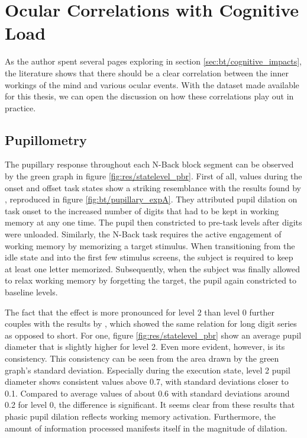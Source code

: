 \section{Ocular Correlations with Cognitive Load}

As the author spent several pages exploring in section \ref{sec:bt/cognitive_impacts}, the literature shows that there should be a clear correlation between the inner workings of the mind and various ocular events. With the dataset made available for this thesis, we can open the discussion on how these correlations play out in practice. 

\subsection{Pupillometry}

The pupillary response throughout each N-Back block segment can be observed by the green graph in figure \ref{fig:res/statelevel_pbr}. First of all, values during the onset and offset task states show a striking resemblance with the results found by \textcite{kahneman1966}, reproduced in figure \ref{fig:bt/pupillary_expA}. They attributed pupil dilation on task onset to the increased number of digits that had to be kept in working memory at any one time. The pupil then constricted to pre-task levels after digits were unloaded. Similarly, the N-Back task requires the active engagement of working memory by memorizing a target stimulus. When transitioning from the idle state and into the first few stimulus screens, the subject is required to keep at least one letter memorized. Subsequently, when the subject was finally allowed to relax working memory by forgetting the target, the pupil again constricted to baseline levels.


The fact that the effect is more pronounced for level 2 than level 0 further couples with the results by \textcite{kahneman1966}, which showed the same relation for long digit series as opposed to short. For one, figure \ref{fig:res/statelevel_pbr} show an average pupil diameter that is slightly higher for level 2. Even more evident, however, is its consistency. This consistency can be seen from the area drawn by the green graph's standard deviation. Especially during the execution state, level 2 pupil diameter shows consistent values above 0.7, with standard deviations closer to 0.1. Compared to average values of about 0.6 with standard deviations around 0.2 for level 0, the difference is significant. It seems clear from these results that phasic pupil dilation reflects working memory activation. Furthermore, the amount of information processed manifests itself in the magnitude of dilation.

